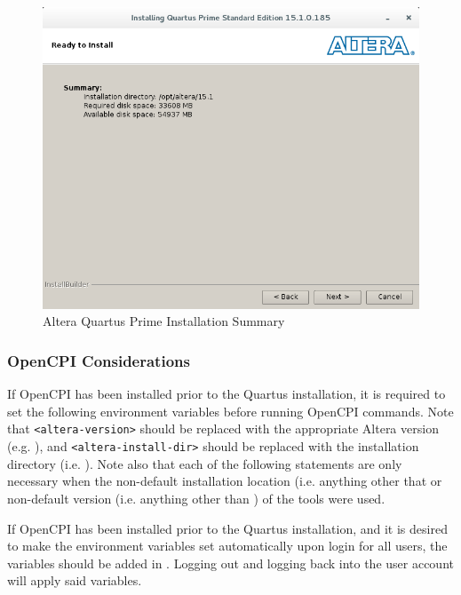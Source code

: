 \begin{flushleft}
\begin{enumerate}
\begin{figure}[H]
	\centerline{\includegraphics[scale=0.5]{figures/altera_install_6}}
	\caption{Altera Quartus Prime Installation Summary}
\end{figure}
\end{enumerate}


\subsubsection{OpenCPI Considerations}
If OpenCPI has been installed prior to the Quartus installation, it is required to set the following environment variables before running OpenCPI commands. Note that \texttt{<altera-version>} should be replaced with the appropriate Altera version (e.g. ), and \texttt{<altera-install-dir>} should be replaced with the installation directory (i.e. ). Note also that each of the following  statements are only necessary when the non-default installation location (i.e. anything other that  or non-default version (i.e. anything other than ) of the tools were used.\newline
{}\newline
{}\newline
{}

If OpenCPI has been installed prior to the Quartus installation, and it is desired to make the environment variables set automatically upon login for all users, the variables should be added in . Logging out and logging back into the user account will apply said variables.


\end{flushleft}
